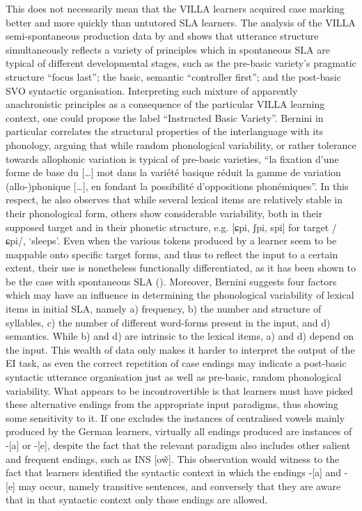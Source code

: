 This does not necessarily mean that the VILLA learners acquired case marking better and more quickly than untutored SLA learners. The analysis of the VILLA semi-spontaneous production data by \citet{Bernini2016} and \citet{Dimroth2018} shows that utterance structure simultaneously reflects a variety of principles which in spontaneous SLA are typical of different developmental stages, such as the pre-basic variety’s pragmatic structure ``focus last''; the basic, semantic ``controller first''; and the post-basic SVO syntactic organisation. Interpreting such mixture of apparently anachronistic principles as a consequence of the particular VILLA learning context, one could propose the label ``Instructed Basic Variety''. Bernini in particular correlates the structural properties of the interlanguage with its phonology, arguing that while random phonological variability, or rather tolerance towards allophonic variation is typical of pre-basic varieties, ``la fixation d’une forme de base du […] mot dans la variété basique réduit la gamme de variation (allo-)phonique […], en fondant la possibilité d’oppositions phonémiques''. In this respect, he also observes that while several lexical items are relatively stable in their phonological form, others show considerable variability, both in their supposed target and in their phonetic structure, e.g. [ɕpi, ʃpi, spi] for target /ɕpi/, ‘sleeps’. Even when the various tokens produced by a learner seem to be mappable onto specific target forms, and thus to reflect the input to a certain extent, their use is nonetheless functionally differentiated, as it has been shown to be the case with spontaneous SLA (\citealt{BroederEtAl1993}). Moreover, Bernini suggests four factors which may have an influence in determining the phonological variability of lexical items in initial SLA, namely a) frequency, b) the number and structure of syllables, c) the number of different word-forms present in the input, and d) semantics. While b) and d) are intrinsic to the lexical items, a) and d) depend on the input. This wealth of data only makes it harder to interpret the output of the EI task, as even the correct repetition of case endings may indicate a post-basic syntactic utterance organisation just as well as pre-basic, random phonological variability. What appears to be incontrovertible is that learners must have picked these alternative endings from the appropriate input paradigms, thus showing some sensitivity to it. If one excludes the instances of centralised vowels mainly produced by the German learners, virtually all endings produced are instances of -[a] or -[e], despite the fact that the relevant paradigm also includes other salient and frequent endings, such as INS [o\~{w}]. This observation would witness to the fact that learners identified the syntactic context in which the endings -[a] and -[e] may occur, namely transitive sentences, and conversely that they are aware that in that syntactic context only those endings are allowed.

